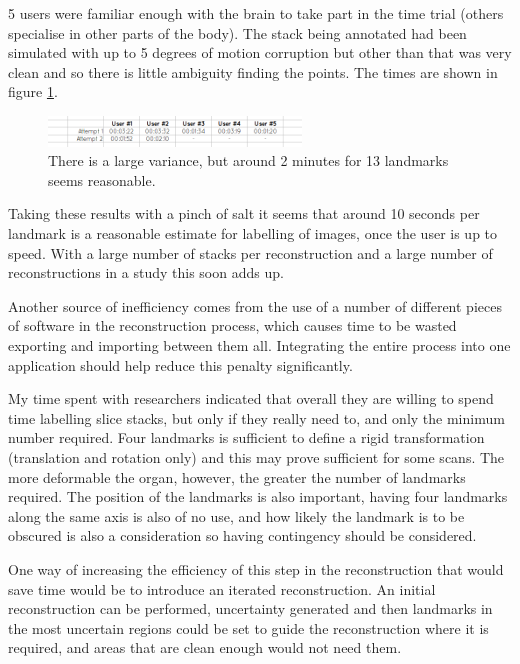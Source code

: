 5 users were familiar enough with the brain to take part in the time trial (others specialise in other parts of the body). The stack being annotated had been simulated with up to 5 degrees of motion corruption but other than that was very clean and so there is little ambiguity finding the points. The times are shown in figure \ref{fig:landmarktimes}. 

\begin{figure}[h]
    \centering
  \includegraphics[width=0.6\textwidth]{images/evaluation/graph_reconstruction_landmark_times.png}
    \caption{There is a large variance, but around 2 minutes for 13 landmarks seems reasonable.}\label{fig:landmarktimes}
\end{figure}

Taking these results with a pinch of salt it seems that around 10 seconds per landmark is a reasonable estimate for labelling of images, once the user is up to speed. With a large number of stacks per reconstruction and a large number of reconstructions in a study this soon adds up.

Another source of inefficiency comes from the use of a number of different pieces of software in the reconstruction process, which causes time to be wasted exporting and importing between them all. Integrating the entire process into one application should help reduce this penalty significantly.

My time spent with researchers indicated that overall they are willing to spend time labelling slice stacks, but only if they really need to, and only the minimum number required. Four landmarks is sufficient to define a rigid transformation (translation and rotation only) and this may prove sufficient for some scans. The more deformable the organ, however, the greater the number of landmarks required. The position of the landmarks is also important, having four landmarks along the same axis is also of no use, and how likely the landmark is to be obscured is also a consideration so having contingency should be considered.

One way of increasing the efficiency of this step in the reconstruction that would save time would be to introduce an iterated reconstruction. An initial reconstruction can be performed, uncertainty generated and then landmarks in the most uncertain regions could be set to guide the reconstruction where it is required, and areas that are clean enough would not need them.

